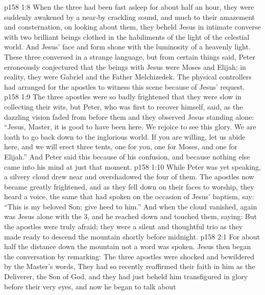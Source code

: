 \vs p158 1:8 When the three had been fast asleep for about half an hour, they were suddenly awakened by a near\hyp{}by crackling sound, and much to their amazement and consternation, on looking about them, they beheld Jesus in intimate converse with two brilliant beings clothed in the habiliments of the light of the celestial world. And Jesus’ face and form shone with the luminosity of a heavenly light. These three conversed in a strange language, but from certain things said, Peter erroneously conjectured that the beings with Jesus were Moses and Elijah; in reality, they were Gabriel and the Father Melchizedek. The physical controllers had arranged for the apostles to witness this scene because of Jesus’ request.
\vs p158 1:9 The three apostles were so badly frightened that they were slow in collecting their wits, but Peter, who was first to recover himself, said, as the dazzling vision faded from before them and they observed Jesus standing alone: “Jesus, Master, it is good to have been here. We rejoice to see this glory. We are loath to go back down to the inglorious world. If you are willing, let us abide here, and we will erect three tents, one for you, one for Moses, and one for Elijah.” And Peter said this because of his confusion, and because nothing else came into his mind at just that moment.
\vs p158 1:10 While Peter was yet speaking, a silvery cloud drew near and overshadowed the four of them. The apostles now became greatly frightened, and as they fell down on their faces to worship, they heard a voice, the same that had spoken on the occasion of Jesus’ baptism, say: “This is my beloved Son; give heed to him.” And when the cloud vanished, again was Jesus alone with the 3, and he reached down and touched them, saying:  But the apostles were truly afraid; they were a silent and thoughtful trio as they made ready to descend the mountain shortly before midnight.
\vs p158 2:1 For about half the distance down the mountain not a word was spoken. Jesus then began the conversation by remarking:  The three apostles were shocked and bewildered by the Master’s words,  They had so recently reaffirmed their faith in him as the Deliverer, the Son of God, and they had just beheld him transfigured in glory before their very eyes, and now he began to talk about 
